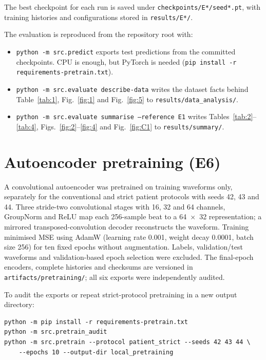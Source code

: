 \documentclass[10pt,a4paper]{article}
\begin{document}
The best checkpoint for each run is saved under \texttt{checkpoints/E*/seed*.pt}, with training histories and configurations stored in \texttt{results/E*/}.

The evaluation is reproduced from the repository root with:

{\raggedright\begin{itemize}
\item \texttt{python -m src.predict} exports test predictions from the committed checkpoints. CPU is enough, but PyTorch is needed (\texttt{pip install -r requirements-pretrain.txt}).
\item \texttt{python -m src.evaluate describe-data} writes the dataset facts behind Table~\ref{tab:1}, Fig.~\ref{fig:1} and Fig.~\ref{fig:5} to \texttt{results/data\_analysis/}.
\item \texttt{python -m src.evaluate summarise --reference E1} writes Tables~\ref{tab:2}--\ref{tab:4}, Figs.~\ref{fig:2}--\ref{fig:4} and Fig.~\ref{fig:C1} to \texttt{results/summary/}.
\end{itemize}\par}

\section{Autoencoder pretraining (E6)}

A convolutional autoencoder was pretrained on training waveforms only, separately for the conventional and strict patient protocols with seeds 42, 43 and 44. Three stride-two convolutional stages with 16, 32 and 64 channels, GroupNorm and ReLU map each 256-sample beat to a 64~×~32 representation; a mirrored transposed-convolution decoder reconstructs the waveform. Training minimised MSE using AdamW (learning rate 0.001, weight decay 0.0001, batch size 256) for ten fixed epochs without augmentation. Labels, validation/test waveforms and validation-based epoch selection were excluded. The final-epoch encoders, complete histories and checksums are versioned in \texttt{artifacts/pretraining/}; all six exports were independently audited.

To audit the exports or repeat strict-protocol pretraining in a new output directory:

{\small\begin{verbatim}
python -m pip install -r requirements-pretrain.txt
python -m src.pretrain_audit
python -m src.pretrain --protocol patient_strict --seeds 42 43 44 \
    --epochs 10 --output-dir local_pretraining
\end{verbatim}}
\end{document}
